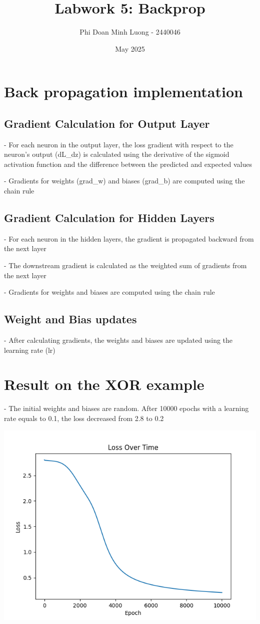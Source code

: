 \documentclass{article}
\title{Labwork 5: Backprop}
\author{Phi Doan Minh Luong - 2440046}
\date{May 2025}
\begin{document}
\maketitle

\setlength\parindent{0pt}

\section{Back propagation implementation}
\subsection{Gradient Calculation for Output Layer}
- For each neuron in the output layer, the loss gradient with respect to the neuron's output (dL\_dz) is calculated using the derivative of the sigmoid activation function and the difference between the predicted and expected values

- Gradients for weights (grad\_w) and biases (grad\_b) are computed using the chain rule

\subsection{Gradient Calculation for Hidden Layers}
- For each neuron in the hidden layers, the gradient is propagated backward from the next layer

- The downstream gradient is calculated as the weighted sum of gradients from the next layer

- Gradients for weights and biases are computed using the chain rule

\subsection{Weight and Bias updates}
- After calculating gradients, the weights and biases are updated using the learning rate (lr)

\section{Result on the XOR example}
- The initial weights and biases are random. After 10000 epochs with a learning rate equals to 0.1, the loss decreased from 2.8 to 0.2

\begin{center}
    \includegraphics[width=0.5\linewidth]{image.png}
\end{center}
\end{document}

